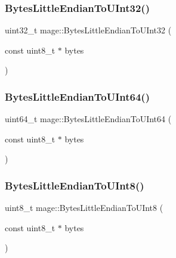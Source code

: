 \hypertarget{namespacemage_a453e851f136573bfc7839157786472a4}{}\label{namespacemage_a453e851f136573bfc7839157786472a4} 
\subsubsection{\texorpdfstring{Bytes\+Little\+Endian\+To\+U\+Int32()}{BytesLittleEndianToUInt32()}}
{\footnotesize\ttfamily uint32\+\_\+t mage\+::\+Bytes\+Little\+Endian\+To\+U\+Int32 (\begin{DoxyParamCaption}\item[{const uint8\+\_\+t $\ast$}]{bytes }\end{DoxyParamCaption})}

\hypertarget{namespacemage_ae6f54de05a834fbb34a75312479009ba}{}\label{namespacemage_ae6f54de05a834fbb34a75312479009ba} 
\subsubsection{\texorpdfstring{Bytes\+Little\+Endian\+To\+U\+Int64()}{BytesLittleEndianToUInt64()}}
{\footnotesize\ttfamily uint64\+\_\+t mage\+::\+Bytes\+Little\+Endian\+To\+U\+Int64 (\begin{DoxyParamCaption}\item[{const uint8\+\_\+t $\ast$}]{bytes }\end{DoxyParamCaption})}

\hypertarget{namespacemage_ac06182df9bf408e6de663497d9760724}{}\label{namespacemage_ac06182df9bf408e6de663497d9760724} 
\subsubsection{\texorpdfstring{Bytes\+Little\+Endian\+To\+U\+Int8()}{BytesLittleEndianToUInt8()}}
{\footnotesize\ttfamily uint8\+\_\+t mage\+::\+Bytes\+Little\+Endian\+To\+U\+Int8 (\begin{DoxyParamCaption}\item[{const uint8\+\_\+t $\ast$}]{bytes }\end{DoxyParamCaption})}

